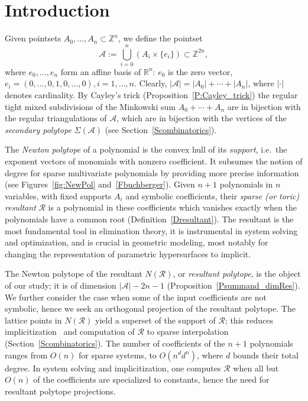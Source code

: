 \documentclass{article}
\def\RR{{\mathbb R}} \def\ZZ{{\mathbb Z}}
\def\A{{\mathcal A}} \def\R{{\mathcal R}}
\begin{document}
\section{Introduction}

Given pointsets $A_0,\dots,A_n\subset \ZZ^n$, we define the pointset
\begin{equation}\label{EQ:Cayley}
\A:=\bigcup_{i=0}^{n} (A_{i} \times \{e_{i}\}) \subset \ZZ^{2n},
\end{equation}
where $e_0,\ldots,e_n$ form an affine basis of $\RR^n$:
$e_{0}$ is the zero vector,\linebreak
\(e_i = (0, \dots, 0, 1, 0, \dots, 0), i = 1, \dots, n\).
Clearly, $|\A| = |A_0|+ \cdots +|A_n|$, where $|\cdot|$ denotes cardinality.
By Cayley's trick (Proposition~\ref{P:Cayley_trick}) the
regular tight mixed subdivisions of the Mink\-owski sum $A_0+ \cdots +A_n$  
are in bijection with the regular triangulations of $\A$, which
are in bijection with the vertices of the {\em secondary polytope} $\Sigma(\A)$
(see Section~\ref{Scombinatorics}).

The {\em Newton polytope} of a polynomial is 
the convex hull of its {\em support}, i.e.\
the exponent vectors of monomials with nonzero coefficient.
It subsumes the notion of degree for sparse multivariate polynomials by
providing more precise information (see Figures~\ref{fig:NewPol}
and~\ref{Fbuchberger}).
Given $n+1$ polynomials in $n$ variables, with fixed supports $A_i$
and symbolic coefficients, their {\em sparse (or toric) resultant} $\R$
is a polynomial in these coefficients which vanishes exactly when the
polynomials have a common root (Definition~\ref{Dresultant}).
The resultant is the most fundamental tool in elimination theory,
it is instrumental in system solving and optimization, and is crucial
in geometric modeling, most notably for
changing the representation of parametric hypersurfaces to implicit.

The Newton polytope of the resultant $N(\R)$, or \textit{resultant polytope},
is the object of our study; it is of dimension $|\A| -2n-1$
(Proposition~\ref{Psummand_dimRes}).
We further consider the case when some of the input coefficients are not
symbolic, hence we seek an orthogonal projection of the resultant polytope.
The lattice points in $N(\R)$ yield a superset of the support of $\R$;
this reduces implicitization~\citess{EmKaKoLB,StuYu08} and computation of
$\R$ to sparse interpolation (Section~\ref{Scombinatorics}).  
The number of coefficients of the $n+1$ polynomials ranges from $O(n)$
for sparse systems,
to $O(n^d d^n)$, where $d$ bounds their total degree.
In system solving and implicitization, one computes $\R$ when all but
$O(n)$ of the coefficients are specialized to constants, hence the
need for resultant polytope projections.  
\end{document}
